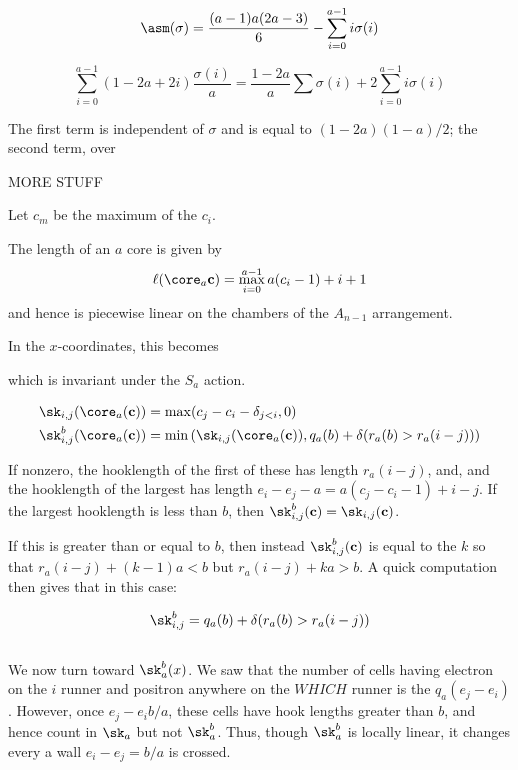 \begin{lemma}
$$\asm(\sigma)=\frac{(a-1)a(2a-3)}{6}-\sum_{i=0}^{a-1}i\sigma(i)$$




$$\sum_{i=0}^{a-1} (1-2a+2i)\frac{\sigma(i)}{a}=\frac{1-2a}{a}\sum\sigma(i)+2\sum_{i=0}^{a-1}i\sigma(i)$$

The first term is independent of $\sigma$ and is equal to $(1-2a)(1-a)/2$; the second term, over




MORE STUFF

\begin{lemma}
Let $c_m$ be the maximum of the $c_i$.

The length of an $a$ core is given by
$$\ell(\core_a{\mathbf{c}})=\max_{i=0}^{a-1} a(c_i-1)+i+1$$
and hence is piecewise linear on the chambers of the $A_{n-1}$ arrangement.

In the $x$-coordinates, this becomes

 which is invariant under the $S_a$ action.
\end{lemma}

\begin{lemma}
\begin{align*}
\sk_{i,j}(\core_a(\mathbf{c}))&=\max(c_j-c_i-\delta_{j<i},0) \\
\sk^b_{i,j}(\core_a(\mathbf{c}))&=\min\left(\sk_{i,j}(\core_a(\mathbf{c})), q_a(b)+\delta(r_a(b)>r_a(i-j))\right)
\end{align*}
\end{lemma}


If nonzero, the hooklength of the first of these has length $r_a(i-j)$, and, and the hooklength of the largest has length
$e_i-e_j-a=a(c_j-c_i-1)+i-j$.  If the largest hooklength is less than $b$, then $\sk^b_{i,j}(\mathbf{c})=\sk_{i,j}(\mathbf{c})$.

If this is greater than or equal to $b$, then instead $\sk^b_{i,j}(\mathbf{c})$ is equal to the $k$ so that $r_a(i-j)+(k-1)a<b$ but $r_a(i-j)+ka>b$.  A quick computation then gives that in this case:

$$\sk_{i,j}^b=q_a(b)+\delta(r_a(b)>r_a(i-j))$$

\subsection{}
We now turn toward $\sk_a^b(x)$.  We saw that the number of cells
having electron on the $i$ runner and positron anywhere on the $WHICH$
runner is the $q_a(e_j-e_i)$.  However, once $e_j-e_ib/a$, these cells have hook lengths greater than $b$, and hence count in
$\sk_a$ but not $\sk_a^b$.  Thus, though $\sk_a^b$ is locally linear, it changes every a wall $e_i-e_j=b/a$ is crossed.





\end{lemma}
